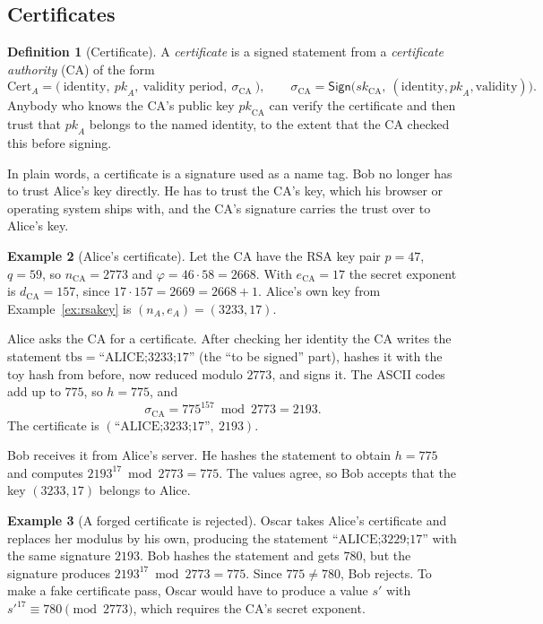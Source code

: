 \documentclass[11pt,a4paper]{article}
\theoremstyle{definition}
\newtheorem{definition}{Definition}[section]
\newtheorem{example}[definition]{Example}
\newcommand{\Sign}{\mathsf{Sign}}
\newcommand{\sk}{\mathit{sk}}
\newcommand{\pk}{\mathit{pk}}
\begin{document}
\subsection{Certificates}

\begin{definition}[Certificate]
A \emph{certificate} is a signed statement from a \emph{certificate authority} (CA) of the form
\[
\mathrm{Cert}_A=\big(\ \text{identity},\ \pk_A,\ \text{validity period},\ \sigma_{\mathrm{CA}}\ \big),\qquad \sigma_{\mathrm{CA}}=\Sign\big(\sk_{\mathrm{CA}},\ (\text{identity},\pk_A,\text{validity})\big).
\]
Anybody who knows the CA's public key $\pk_{\mathrm{CA}}$ can verify the certificate and then trust that $\pk_A$ belongs to the named identity, to the extent that the CA checked this before signing.
\end{definition}

In plain words, a certificate is a signature used as a name tag. Bob no longer has to trust Alice's key directly. He has to trust the CA's key, which his browser or operating system ships with, and the CA's signature carries the trust over to Alice's key.

\begin{example}[Alice's certificate]\label{ex:cert}
Let the CA have the RSA key pair $p=47$, $q=59$, so $n_{\mathrm{CA}}=2773$ and $\varphi=46\cdot 58=2668$. With $e_{\mathrm{CA}}=17$ the secret exponent is $d_{\mathrm{CA}}=157$, since $17\cdot 157=2669=2668+1$. Alice's own key from Example~\ref{ex:rsakey} is $(n_A,e_A)=(3233,17)$.

Alice asks the CA for a certificate. After checking her identity the CA writes the statement $\mathrm{tbs}=\text{``ALICE;3233;17''}$ (the ``to be signed'' part), hashes it with the toy hash from before, now reduced modulo $2773$, and signs it. The ASCII codes add up to $775$, so $h=775$, and
\[
\sigma_{\mathrm{CA}}=775^{157} \bmod 2773=2193.
\]
The certificate is $(\text{``ALICE;3233;17''},\ 2193)$.

Bob receives it from Alice's server. He hashes the statement to obtain $h=775$ and computes $2193^{17} \bmod 2773=775$. The values agree, so Bob accepts that the key $(3233,17)$ belongs to Alice.
\end{example}

\begin{example}[A forged certificate is rejected]\label{ex:certforge}
Oscar takes Alice's certificate and replaces her modulus by his own, producing the statement $\text{``ALICE;3229;17''}$ with the same signature $2193$. Bob hashes the statement and gets $780$, but the signature produces $2193^{17} \bmod 2773=775$. Since $775\ne 780$, Bob rejects. To make a fake certificate pass, Oscar would have to produce a value $s'$ with $s'^{17}\equiv 780 \pmod{2773}$, which requires the CA's secret exponent.
\end{example}
\end{document}
